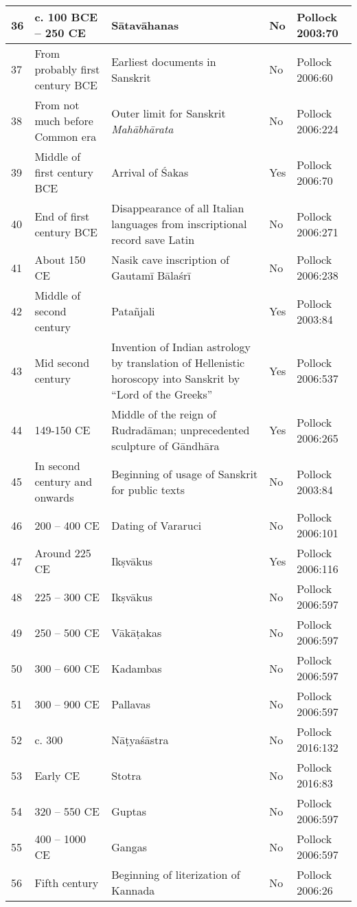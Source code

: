 \begin{longtable}{|l|p{1.9cm}|p{1.9cm}|p{1.6cm}|p{1.6cm}|}
\hline
36 & c. 100 BCE – 250 CE & Sātavāhanas & No & Pollock 2003:70 \\
\hline
37 & From probably first century BCE & Earliest documents in Sanskrit & No & Pollock 2006:60 \\
\hline
38 & From not much before Common era & Outer limit for Sanskrit \textit{Mahābhārata} & No & Pollock 2006:224 \\
\hline
39 & Middle of first century BCE & Arrival of Śakas & Yes & Pollock 2006:70 \\
\hline
40 & End of first century BCE & Disappearance of all Italian languages from inscriptional record save Latin & No & Pollock 2006:271 \\
\hline
41 & About 150 CE & Nasik cave inscription of Gautamī Bālaśrī & No & Pollock 2006:238 \\
\hline
42 & Middle of second century & Patañjali & Yes & Pollock 2003:84 \\
\hline
43 & Mid second century & Invention of Indian astrology by translation of Hellenistic horoscopy into Sanskrit by “Lord of the Greeks” & Yes & Pollock 2006:537 \\
\hline
44 & 149-150 CE & Middle of the reign of Rudradāman; unprecedented sculpture of Gāndhāra & Yes & Pollock 2006:265 \\
\hline
45 & In second century and onwards & Beginning of usage of Sanskrit for public texts & No & Pollock 2003:84 \\
\hline
46 & 200 – 400 CE & Dating of Vararuci & No & Pollock 2006:101 \\
\hline
47 & Around 225 CE & Ikṣvākus & Yes & Pollock 2006:116 \\
\hline
48 & 225 – 300 CE & Ikṣvākus & No & Pollock 2006:597 \\
\hline
49 & 250 – 500 CE & Vākāṭakas & No & Pollock 2006:597 \\
\hline
50 & 300 – 600 CE & Kadambas & No & Pollock 2006:597 \\
\hline
51 & 300 – 900 CE & Pallavas & No & Pollock 2006:597 \\
\hline
52 & c. 300 & Nāṭyaśāstra & No & Pollock 2016:132 \\
\hline
53 & Early CE & Stotra & No & Pollock 2016:83 \\
\hline
54 & 320 – 550 CE & Guptas & No & Pollock 2006:597 \\
\hline
55 & 400 – 1000 CE & Gangas & No & Pollock 2006:597 \\
\hline
56 & Fifth century & Beginning of literization of Kannada & No & Pollock 2006:26 \\

\end{longtable}
